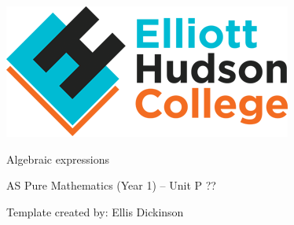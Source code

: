 \documentclass[fleqn]{article}
\newcommand\getcurrentref[1]{%
 \ifnumequal{\value{#1}}{0}
  {??}
  {\the\value{#1}}%
}
\newcommand\YUGE{\fontsize{35}{35}\selectfont}
\newcommand{\coursetitle}{AS Pure Mathematics (Year 1)}				%
\newcommand{\bookletunittitle}{Algebraic expressions}				%
\newcommand{\bookletsubtitle}{{\rmfamily\LaTeX} Template created by: Ellis Dickinson}	%
\newcommand{\formattedunittitle}{Unit P\getcurrentref{section}} 		%
\begin{document}
\vspace{-0.5cm}
\includegraphics[scale=0.35]{images/ehc-logo-retina}

\vspace{8.5cm}
\begin{minipage}{\textwidth}
	\sffamily

	\vspace{2mm}
	{\YUGE \raggedleft\bookletunittitle\\}

	\vspace{1mm}
	{\huge \raggedleft\coursetitle { }-- \formattedunittitle\\}

	\vspace{2mm}
	{\small \raggedleft\bookletsubtitle\\}
\end{minipage}
\end{document}
